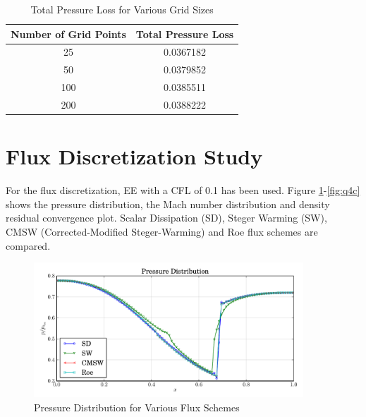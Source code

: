 \documentclass[letterpaper,12pt,]{article}
\begin{document}
\begin{table}[!h]
\centering
\begin{tabular}{cc} \toprule
    {Number of Grid Points} & {Total Pressure Loss} \\
    \midrule
    {25}  & 0.0367182\\
    {50}  & 0.0379852\\
    {100} & 0.0385511\\
    {200} & 0.0388222\\
\bottomrule
\end{tabular}
\caption{Total Pressure Loss for Various Grid Sizes}
\label{tab1}
\end{table}

\section{Flux Discretization Study}

For the flux discretization, EE with a CFL of 0.1 has been used.
Figure \ref{fig:q4p}-\ref{fig:q4c} shows the pressure distribution, the Mach number distribution and density residual convergence plot.
Scalar Dissipation (SD), Steger Warming (SW), CMSW (Corrected-Modified Steger-Warming) and Roe flux schemes are compared.

\begin{figure}[!ht]
    \centering
    \includegraphics[width = 0.9\textwidth]{./figures/q4p.pdf}
    \caption {Pressure Distribution for Various Flux Schemes}
    \label{fig:q4p}
\end{figure}
\end{document}

